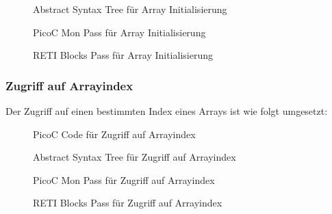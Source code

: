 \begin{figure}[H]
  \centering
  \caption{Abstract Syntax Tree für Array Initialisierung}
  \label{fig:abstract_syntax_tree_für_array_initialisierung}
\end{figure}

\begin{figure}[H]
  \centering
  \caption{PicoC Mon Pass für Array Initialisierung}
  \label{fig:picoc_mon_für_array_initialisierung}
\end{figure}

\begin{figure}[H]
  \centering
  \caption{RETI Blocks Pass für Array Initialisierung}
  \label{fig:reti_blocks_für_array_initialisierung}
\end{figure}


\subsubsection{Zugriff auf Arrayindex}
Der Zugriff auf einen bestimmten  Index eines Arrays ist wie folgt umgesetzt:

\begin{figure}[H]
  \centering
  \caption{PicoC Code für Zugriff auf Arrayindex}
  \label{fig:picoc_code_für_zugriff_auf_arrayindex}
\end{figure}

\begin{figure}[H]
  \centering
  \caption{Abstract Syntax Tree für Zugriff auf Arrayindex}
  \label{fig:abstract_syntax_tree_für_zugriff_auf_arrayindex}
\end{figure}

\begin{figure}[H]
  \centering
  \caption{PicoC Mon Pass für Zugriff auf Arrayindex}
  \label{fig:picoc_mon_für_zugriff_auf_arrayindex}
\end{figure}

\begin{figure}[H]
  \centering
  \caption{RETI Blocks Pass für Zugriff auf Arrayindex}
  \label{fig:reti_blocks_für_zugriff_auf_arrayindex}
\end{figure}

